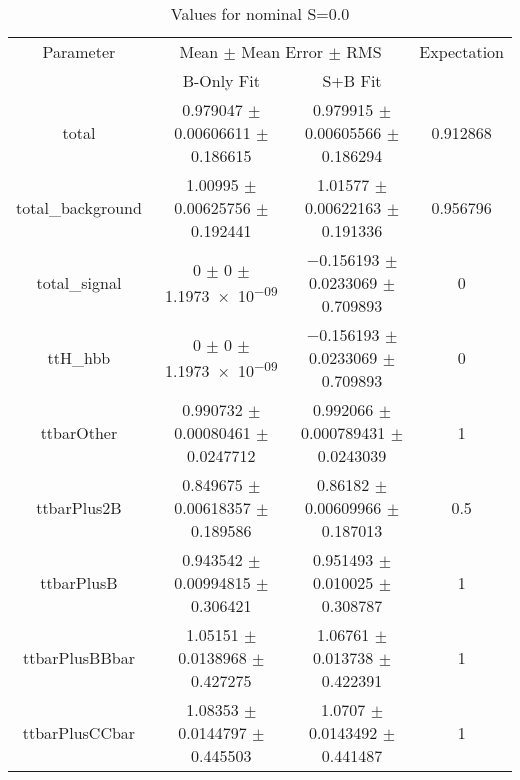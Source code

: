 \begin{table}
\centering
\caption{Values for nominal S=0.0}
\begin{tabular}{cccc}
\toprule
Parameter & \multicolumn{2}{c}{Mean $\pm$ Mean Error $\pm$ RMS} & Expectation\\
 & B-Only Fit & S+B Fit & \\
\midrule
total & \num{0.979047} $\pm$ \num{0.00606611} $\pm$ \num{0.186615} & \num{0.979915} $\pm$ \num{0.00605566} $\pm$ \num{0.186294} & \num{0.912868}\\
total\_background & \num{1.00995} $\pm$ \num{0.00625756} $\pm$ \num{0.192441} & \num{1.01577} $\pm$ \num{0.00622163} $\pm$ \num{0.191336} & \num{0.956796}\\
total\_signal & \num{0} $\pm$ \num{0} $\pm$ \num{1.1973e-09} & \num{-0.156193} $\pm$ \num{0.0233069} $\pm$ \num{0.709893} & \num{0}\\
ttH\_hbb & \num{0} $\pm$ \num{0} $\pm$ \num{1.1973e-09} & \num{-0.156193} $\pm$ \num{0.0233069} $\pm$ \num{0.709893} & \num{0}\\
ttbarOther & \num{0.990732} $\pm$ \num{0.00080461} $\pm$ \num{0.0247712} & \num{0.992066} $\pm$ \num{0.000789431} $\pm$ \num{0.0243039} & \num{1}\\
ttbarPlus2B & \num{0.849675} $\pm$ \num{0.00618357} $\pm$ \num{0.189586} & \num{0.86182} $\pm$ \num{0.00609966} $\pm$ \num{0.187013} & \num{0.5}\\
ttbarPlusB & \num{0.943542} $\pm$ \num{0.00994815} $\pm$ \num{0.306421} & \num{0.951493} $\pm$ \num{0.010025} $\pm$ \num{0.308787} & \num{1}\\
ttbarPlusBBbar & \num{1.05151} $\pm$ \num{0.0138968} $\pm$ \num{0.427275} & \num{1.06761} $\pm$ \num{0.013738} $\pm$ \num{0.422391} & \num{1}\\
ttbarPlusCCbar & \num{1.08353} $\pm$ \num{0.0144797} $\pm$ \num{0.445503} & \num{1.0707} $\pm$ \num{0.0143492} $\pm$ \num{0.441487} & \num{1}\\
\bottomrule
\end{tabular}
\end{table}